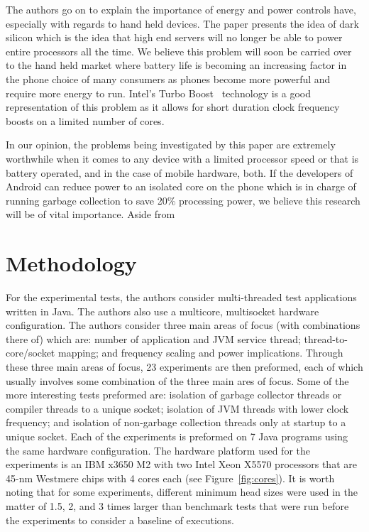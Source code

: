 \documentclass[conference]{IEEEtran}
\begin{document}
The authors go on to explain
the importance of energy and power controls have, especially with regards to hand held devices.
The paper presents the idea of dark silicon which is the idea that high end servers will no longer
be able to power entire processors all the time. We believe this problem will soon be carried
over to the hand held market where battery life is becoming an increasing factor in the phone choice
of many consumers as phones become more powerful and require more energy to run. Intel's Turbo
Boost~\cite{Intel:2008} technology is a good representation of this problem as it allows for short duration 
clock frequency boosts on a limited number of cores.

In our opinion, the problems being investigated by this paper are extremely worthwhile when
it comes to any device with a limited processor speed or that is battery operated, and in the
case of mobile hardware, both. If the developers of Android can reduce power to an isolated
core on the phone which is in charge of running garbage collection to save 20\% processing
power, we believe this research will be of vital importance. Aside from 

\section{Methodology}

For the experimental tests, the authors consider multi-threaded test applications written in
Java. The authors also use a multicore, multisocket hardware configuration. The authors 
consider three main areas of focus (with combinations there of) which are: number of application
and JVM service thread; thread-to-core/socket mapping; and frequency scaling and power implications.
Through these three main areas of focus, 23 experiments are then preformed, each of which usually
involves some combination of the three main ares of focus. Some of the more interesting tests preformed 
are: isolation of garbage collector threads or compiler threads to a unique socket; isolation of
JVM threads with lower clock frequency; and isolation of non-garbage collection threads only 
at startup to a unique socket. Each of the experiments is preformed on 7 Java programs using
the same hardware configuration. The hardware platform used for the experiments is an IBM
x3650 M2 with two Intel Xeon X5570 processors that are 45-nm Westmere chips with 4 cores each
(see Figure~\ref{fig:cores}). It is worth noting that for some experiments, different minimum
head sizes were used in the matter of 1.5, 2, and 3 times larger than benchmark tests that were
run before the experiments to consider a baseline of executions.
\end{document}
